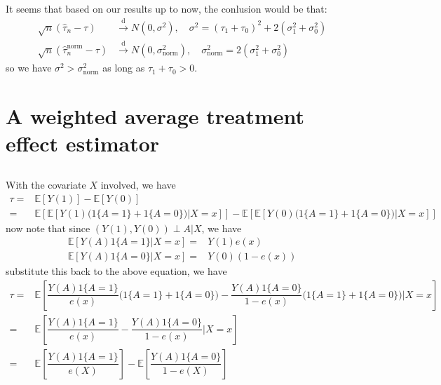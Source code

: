 \documentclass[11pt,a4paper]{ctexart}
\numberwithin{equation}{section}%
\begin{document}
\subsection{}

It seems that based on our results up to now, the conlusion would be that: 
\begin{align*}
    \sqrt{n} (\hat{\tau}_n-\tau)&\xrightarrow[]{\mathrm{d}} N(0, \sigma ^2),\quad \sigma ^2 = (\tau_1+\tau_0)^2 + 2(\sigma _1^2 + \sigma _0^2)\\
    \sqrt{n} (\hat{\tau}_n^\mathrm{ norm }-\tau)&\xrightarrow[]{\mathrm{d}} N(0, \sigma ^2_\mathrm{ norm }),\quad \sigma ^2_\mathrm{ norm } = 2(\sigma _1^2 + \sigma _0^2)
\end{align*}
so we have $ \sigma ^2>\sigma ^2_\mathrm{ norm  }  $ as long as $ \tau_1+\tau_0 > 0 $.





\section{A weighted average treatment effect estimator}
\subsection{}

With the covariate $ X $ involved, we have
\begin{align*}
    \tau =& \mathbb{E}\left[ Y(1) \right]  - \mathbb{E}\left[ Y(0) \right]\\
    =& \mathbb{E}\left[ \mathbb{E}\left[ Y(1)\big(1\{A=1\} + 1\{A=0\}\big) \big| X=x \right]  \right] - \mathbb{E}\left[ \mathbb{E}\left[ Y(0)\big(1\{A=1\} + 1\{A=0\}\big) \big| X=x \right]  \right]
\end{align*}
now note that since $ (Y(1),Y(0)) \perp A |X $, we have
\begin{align*}
    \mathbb{E}\left[ Y(A)1\{A=1\}|X=x \right] =& Y(1)e(x) \\
    \mathbb{E}\left[ Y(A)1\{A=0\}|X=x \right] =& Y(0)(1-e(x))
\end{align*}
substitute this back to the above equation, we have
\begin{align*}
    \tau =& \mathbb{E}\left[ \dfrac{ Y(A)1\{A=1\} }{ e(x) }\big(1\{A=1\} + 1\{A=0\}\big) - \dfrac{ Y(A)1\{A=0\} }{ 1-e(x) }\big(1\{A=1\} + 1\{A=0\}\big) \Big| X=x\right]\\
    =& \mathbb{E}\left[ \dfrac{ Y(A)1\{A=1\} }{ e(x) } - \dfrac{ Y(A)1\{A=0\} }{ 1-e(x) } \Big| X=x\right]\\
    =& \mathbb{E}\left[ \dfrac{ Y(A)1\{A=1\} }{ e(X) }  \right] - \mathbb{E}\left[ \dfrac{ Y(A)1\{A=0\} }{ 1-e(X) }  \right] 
\end{align*}
\end{document}
